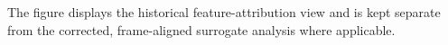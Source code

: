 The figure displays the historical feature-attribution view and is kept separate from the corrected, frame-aligned surrogate analysis where applicable.
